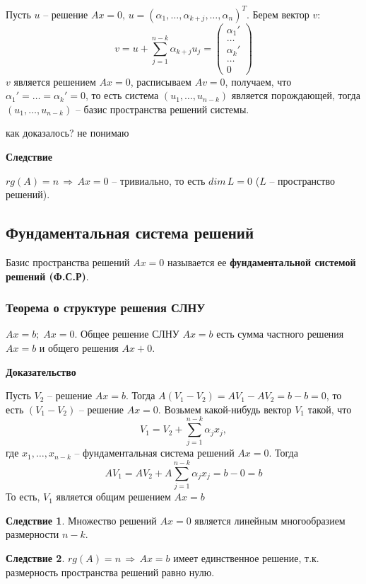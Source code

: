 \documentclass{article}
\begin{document}
Пусть $u$ -- решение $Ax=0,\,u=(\alpha_1,\ldots,\alpha_{k+j},\ldots,\alpha_n)^T$. Берем вектор $v$:
$$ v=u+\sum_{j=1}^{n-k} \alpha_{k+j} u_j =\begin{pmatrix} \alpha_1'\\ \ldots \\ \alpha_k' \\ \ldots \\ 0 \end{pmatrix} $$
$v$ является решением $Ax=0$, расписываем $Av=0$, получаем, что $\alpha_1'=\ldots=\alpha_k'=0$, то есть система $(u_1,\ldots,u_{n-k})$ является порождающей, тогда $(u_1,\ldots,u_{n-k})$ -- базис пространства решений системы.

как доказалось? не понимаю

\textbf{Следствие}

$rg(A)=n\,\Rightarrow\, Ax=0$ -- тривиально, то есть $dim\,L=0$ ($L$ --  пространство решений).

\subsection{Фундаментальная система решений}
Базис пространства решений $Ax = 0$ называется ее \textbf{фундаментальной системой решений (Ф.С.Р)}.
\subsubsection{Теорема о структуре решения СЛНУ}
$Ax=b;\;Ax=0$. Общее решение СЛНУ $Ax=b$ есть сумма частного решения $Ax=b$ и общего решения $Ax+0$.

\textbf{Доказательство}

Пусть $V_2$ -- решение $Ax=b$. Тогда $A(V_1-V_2)=AV_1-AV_2=b-b=0$, то есть $(V_1-V_2)$ -- решение $Ax=0$. Возьмем какой-нибудь вектор $V_1$ такой, что
$$V_1=V_2+\sum_{j=1}^{n-k} \alpha_j x_j, $$
где $x_1,\ldots,x_{n-k}$ -- фундаментальная система решений $Ax=0$. Тогда
$$ AV_1=AV_2+A\sum_{j=1}^{n-k} \alpha_j x_j=b-0=b $$
То есть, $V_1$ является общим решением $Ax=b$

\textbf{Следствие 1}. Множество решений $Ax = 0$ является линейным многообразием размерности $n-k$.

\textbf{Следствие 2}. $rg(A)=n\,\Rightarrow\,Ax=b$ имеет единственное решение, т.к. размерность пространства решений равно нулю.
\newpage
\end{document}
